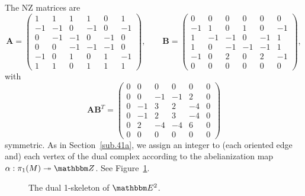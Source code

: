 \documentclass[12pt,reqno]{amsart}
\theoremstyle{definition}
\def\BZ{\mathbbm Z}
\def\BE{\mathbbm E}
\begin{document}
\noindent
The NZ matrices are
{\tiny
\[
\mathbf{A}= \begin{pmatrix}
1 & 1 & 1 & 1 & 0 & 1 \\ -1 & -1 & 0 & -1 & 0 & -1 \\ 0 & -1 & -1 & 0 & -1 & 
  0 \\ 0 & 0 & -1 & -1 & -1 & 0 \\ -1 & 0 & 1 & 0 & 1 & -1 \\ 1 & 1 & 0 & 1 & 1 & 1
\end{pmatrix}, \qquad
  \mathbf{B}= \begin{pmatrix}
0 & 0 & 0 & 0 & 0 & 0 \\ -1 & 1 & 0 & 1 & 0 & -1 \\ 1 & -1 & -1 & 0 & -1 & 1 \\ 1 & 
  0 & -1 & -1 & -1 & 1 \\ -1 & 0 & 2 & 0 & 2 & -1 \\ 0 & 0 & 0 & 0 & 0 & 0
\end{pmatrix}, 
\]
}
with
{\tiny
\[
  \mathbf{A} \mathbf{B}^T = \begin{pmatrix}
0 & 0 & 0 & 0 & 0 & 0 \\ 0 & 0 & -1 & -1 & 2 & 0 \\ 0 & -1 & 3 & 2 & -4 & 
  0 \\ 0 & -1 & 2 & 3 & -4 & 0 \\ 0 & 2 & -4 & -4 & 6 & 0 \\ 0 & 0 & 0 & 0 & 0 & 0
\end{pmatrix}   
\]
}
symmetric. As in Section~\ref{sub.41a}, we assign an integer to (each oriented edge
and) each vertex of the dual complex according to the abelianization map
$\alpha : \pi_1(M)\twoheadrightarrow \BZ$. See Figure~\ref{fig.example63}.

\begin{figure}[htpb!]

\caption{The dual 1-skeleton of $\BE^2$.}
\label{fig.example63}
\end{figure}
\end{document}

